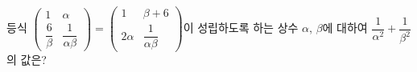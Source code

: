 등식 $\begin{pmatrix} 1 & \alpha \\[2mm] \dfrac{6}{\beta} & \dfrac{1}{\alpha\beta} \end{pmatrix}=\begin{pmatrix} 1 & \beta+6 \\[2mm] 2\alpha & \dfrac{1}{\alpha\beta} \end{pmatrix}$이 성립하도록 하는 상수 $\alpha$, $\beta$에 대하여 $\dfrac{1}{\alpha^2}+\dfrac{1}{\beta^2}$의 값은?
